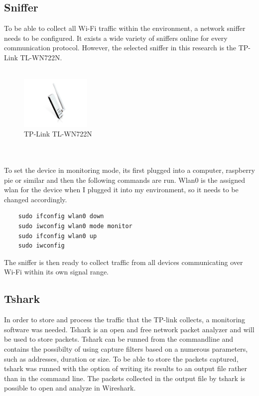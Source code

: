 \subsection{Sniffer}
To be able to collect all Wi-Fi traffic within the environment, a network sniffer needs to be configured. It exists a wide variety of sniffers online for every communication protocol. However, the selected sniffer in this research is the TP-Link TL-WN722N. 
\\\\
\begin{figure} [!ht]
    \centering
    \includegraphics[width=0.3\textwidth]{figures/Sniffer.jpg}
    \caption{TP-Link TL-WN722N \cite{Sniffer}}
    \label{fig:Sniffer}
\end{figure}
\\\\
To set the device in monitoring mode, its first plugged into a computer, raspberry pie or similar and then the following commands are run. Wlan0 is the assigned wlan for the device when I plugged it into my environment, so it needs to be changed accordingly. 
\begin{verbatim}
    sudo ifconfig wlan0 down
    sudo iwconfig wlan0 mode monitor
    sudo ifconfig wlan0 up
    sudo iwconfig
\end{verbatim}
The sniffer is then ready to collect traffic from all devices communicating over Wi-Fi within its own signal range. 
\subsection{Tshark}
In order to store and process the traffic that the TP-link collects, a monitoring software was needed. Tshark is an open and free network packet analyzer and will be used to store packets. Tshark can be runned from the commandline and contains the possibilty of using capture filters based on a numerous parameters, such as addresses, duration or size. To be able to store the packets captured, tshark was runned with the option of writing its results to an output file rather than in the command line. The packets collected in the output file by tshark is possible to open and analyze in Wireshark. 

